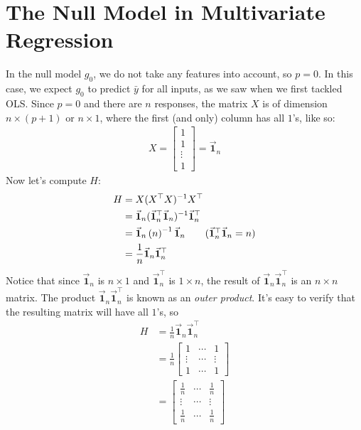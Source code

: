 \documentclass[12pt, a4paper]{article}
\theoremstyle{definition}
\begin{document}
	\section*{The Null Model in Multivariate Regression}
	In the null model $g_0$, we do not take any features into account, so $p=0$. In this case,
	we expect $g_0$ to predict $\bar{y}$ for all inputs, as we saw when we first tackled OLS.
	Since $p=0$ and there are $n$ responses, the matrix $X$ is of dimension $n\times (p+1)$ or
	$n\times 1$, where the first (and only) column has all $1$'s, like so:
	\begin{align*}
		X=\begin{bmatrix}
			1\\
			1\\
			\vdots\\
			1
		\end{bmatrix}
		=\vec{\mathbf{1}}_n
	\end{align*}
	Now let's compute $H$:
	\begin{align*}
		H&=X(X^\top X)^{-1}X^\top\\
		&=\vec{\mathbf{1}}_n(\vec{\mathbf{1}}_n^\top \vec{\mathbf{1}}_n)^{-1} \vec{\mathbf{1}}_n^\top\\
		&=\vec{\mathbf{1}}_n\left(n\right)^{-1}\vec{\mathbf{1}}_n
		\tag{$\vec{\mathbf{1}}_n^\top \vec{\mathbf{1}}_n=n$}\\
		&=\frac{1}{n}\vec{\mathbf{1}}_n \vec{\mathbf{1}}_n^\top
	\end{align*}
	Notice that since $\vec{\mathbf{1}}_n$ is $n\times 1$ and $\vec{\mathbf{1}}_n^\top$ is $1\times n$,
	the result of $\vec{\mathbf{1}}_n \vec{\mathbf{1}}_n^\top$ is an $n\times n$ matrix. The product
	$\vec{\mathbf{1}}_n \vec{\mathbf{1}}_n^\top$ is known as an \textit{outer product}. It's easy to
	verify that the resulting matrix will have all $1$'s, so
	\begin{align*}
		H &=\frac{1}{n}\vec{\mathbf{1}}_n \vec{\mathbf{1}}_n^\top\\
		&=\frac{1}{n}\begin{bmatrix}
			1 & \cdots & 1\\
			\vdots & \cdots & \vdots\\
			1 & \cdots & 1
		\end{bmatrix}
		\tag{The matrix is $n$ by $n$.}\\
		&=\begin{bmatrix}
			\frac{1}{n} & \cdots & \frac{1}{n}\\
			\vdots & \cdots & \vdots\\
			\frac{1}{n} & \cdots & \frac{1}{n}
		\end{bmatrix}
	\end{align*}
\end{document}
